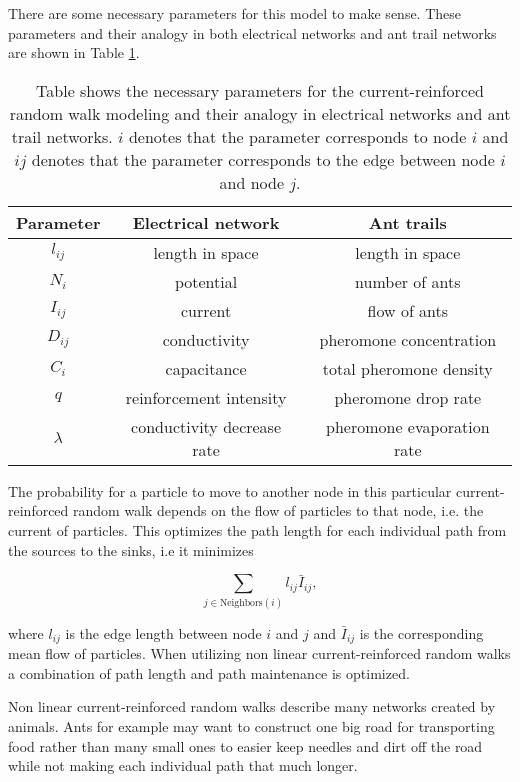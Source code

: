 There are some necessary parameters for this model to make sense. These parameters and their analogy in both electrical networks and ant trail networks are shown in Table \ref{tab:parameters}.
\begin{table}
\centering
\caption{Table shows the necessary parameters for the current-reinforced random walk modeling and their analogy in electrical networks and ant trail networks. $i$ denotes that the parameter corresponds to node $i$ and $ij$ denotes that the parameter corresponds to the edge between node $i$ and node $j$.}
\label{tab:parameters}
\begin{tabular}{ c | c | c }                       
	\textbf{Parameter} & \textbf{Electrical network} & \textbf{Ant trails} \\
	\hline
	$l_{ij}$ & length in space & length in space \\
	\hline
	$N_{i}$ & potential & number of ants \\
	\hline
	$I_{ij}$ & current & flow of ants \\
	\hline
	$D_{ij}$ & conductivity & pheromone concentration \\
	\hline
	$C_{i}$ & capacitance & total pheromone density \\
	\hline
	$q$ & reinforcement intensity & pheromone drop rate \\
	\hline
	$\lambda$ & conductivity decrease rate & pheromone evaporation rate \\
\end{tabular} 
\end{table}

The probability for a particle to move to another node in this particular current-reinforced random walk depends on the flow of particles to that node, i.e. the current of particles. This optimizes the path length for each individual path from the sources to the sinks, i.e it minimizes 

\begin{equation}
\sum_{j \in \text{Neighbors}(i)} l_{ij} \bar{I}_{ij},
\end{equation}

\noindent where $l_{ij}$ is the edge length between node $i$ and $j$ and $\bar{I}_{ij}$ is the corresponding mean flow of particles. When utilizing non linear current-reinforced random walks a combination of path length and path maintenance is optimized. 

Non linear current-reinforced random walks describe many networks created by animals. Ants for example may want to construct one big road for transporting food rather than many small ones to easier keep needles and dirt off the road while not making each individual path that much longer.


